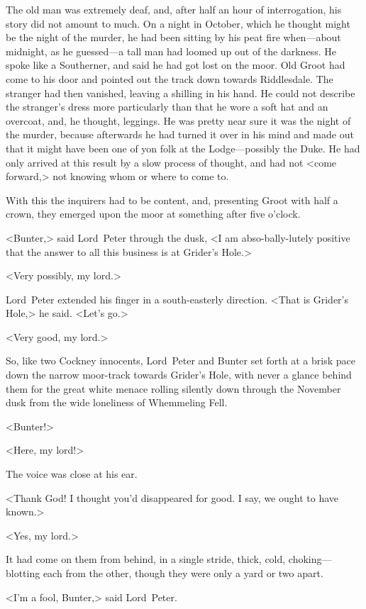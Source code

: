 The old man was extremely deaf, and, after half an hour of interrogation, his story did not amount to much. On a night in October, which he thought might be the night of the murder, he had been sitting by his peat fire when—about midnight, as he guessed—a tall man had loomed up out of the darkness. He spoke like a Southerner, and said he had got lost on the moor. Old Groot had come to his door and pointed out the track down towards Riddlesdale. The stranger had then vanished, leaving a shilling in his hand. He could not describe the stranger's dress more particularly than that he wore a soft hat and an overcoat, and, he thought, leggings. He was pretty near sure it was the night of the murder, because afterwards he had turned it over in his mind and made out that it might have been one of yon folk at the Lodge—possibly the Duke. He had only arrived at this result by a slow process of thought, and had not <come forward,> not knowing whom or where to come to.

With this the inquirers had to be content, and, presenting Groot with half a crown, they emerged upon the moor at something after five o'clock.

<Bunter,> said Lord~Peter through the dusk, <I am abso-bally-lutely positive that the answer to all this business is at Grider's Hole.>

<Very possibly, my lord.>

Lord~Peter extended his finger in a south-easterly direction. <That is Grider's Hole,> he said. <Let's go.>

<Very good, my lord.>

So, like two Cockney innocents, Lord~Peter and Bunter set forth at a brisk pace down the narrow moor-track towards Grider's Hole, with never a glance behind them for the great white menace rolling silently down through the November dusk from the wide loneliness of Whemmeling Fell.

<Bunter!>

<Here, my lord!>

The voice was close at his ear.

<Thank God! I thought you'd disappeared for good. I say, we ought to have known.>

<Yes, my lord.>

It had come on them from behind, in a single stride, thick, cold, choking—blotting each from the other, though they were only a yard or two apart.

<I'm a fool, Bunter,> said Lord~Peter.

